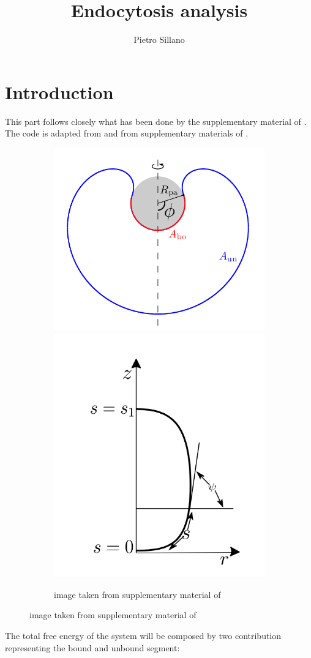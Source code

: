 \documentclass[12pt]{article}
\title{Endocytosis analysis}
\author{Pietro Sillano}
\begin{document}
\maketitle
\tableofcontents

\section{Introduction}
This part follows closely what has been done by the supplementary material of \cite{agudo-canalejoCriticalParticleSizes2015}. 
The code is adapted from \cite{freyMembraneAreaGain2022} and from supplementary materials of \cite{christActiveShapeOscillations2021}.


\begin{figure}[ht]
  \begin{center}
    \begin{subfigure}{0.9\textwidth}
      \includegraphics[width=0.45\linewidth]{img/system.png}
      \includegraphics[width=0.45\linewidth]{img/system2.png}
      \caption{image taken from supplementary material of \cite{agudo-canalejoCriticalParticleSizes2015}}
  \end{subfigure}
  \end{center}
  \label{fig:figure1}
\end{figure}

The total free energy of the system will be composed by two contribution representing the bound and unbound segment:
\end{document}
